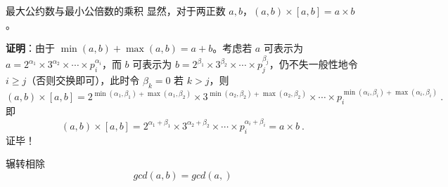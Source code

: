 \begin{theorem}{最大公约数与最小公倍数的乘积}
显然，对于两正数 $a, b$，$(a, b) \times [a, b] = a \times b$。
\end{theorem}
\textbf{证明}：由于 $\min(a, b) + \max(a, b) =a + b$。考虑若 $a$ 可表示为 $a = 2^{\alpha_1} \times 3^{\alpha_2} \times \cdots \times p_i^{\alpha_i}$，而 $b$ 可表示为 $b = 2^{\beta_1} \times 3^{\beta_2} \times \cdots \times p_j^{\beta_j}$，仍不失一般性地令 $i \ge j$（否则交换即可），此时令 $\beta_k = 0$ 若 $k > j$，则
\begin{equation}
(a, b) \times  [a, b] = 2^{\min(\alpha_1, \beta_1) + \max(\alpha_1, \beta_2)} \times 3^{\min(\alpha_2, \beta_2) + \max(\alpha_2, \beta_2)} \times \cdots \times p_i^{\min(\alpha_i, \beta_i) + \max(\alpha_i, \beta_i)} ~.
\end{equation}
即
\begin{equation}
(a,b) \times [a, b] = 2^{\alpha_1 + \beta_1} \times 3^{\alpha_2 + \beta_2} \times \cdots \times p_i^{\alpha_i + \beta_i} = a \times b ~.
\end{equation}
证毕！

\begin{theorem}{辗转相除}
\begin{equation}
gcd(a, b) = gcd(a , )
\end{equation}

\end{theorem}
